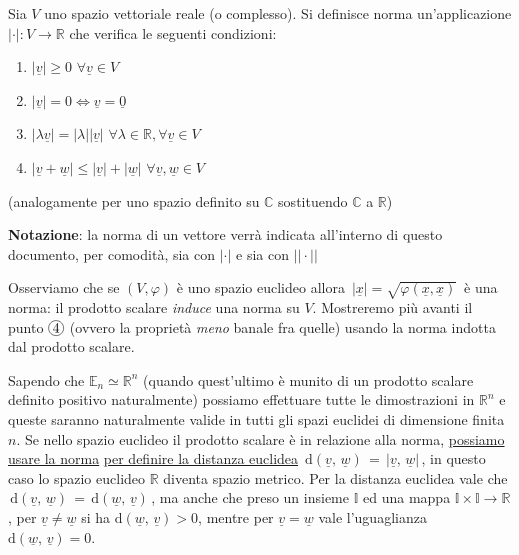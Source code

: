 \begin{definition}[\textcolor{blue}{norma}]
	Sia $V$ uno spazio vettoriale reale (o complesso). Si definisce norma un'applicazione $| \cdot |: V \to \mathbb{R}$ che verifica le seguenti condizioni:
	\begin{enumerate}[label=\protect\circled{\arabic*}]
		\item $|\underline{v}| \geq 0 \, \, \forall \underline{v} \in V$
		\item $| \underline{v} | = 0 \iff \underline{v} = \underline{0}$
		\item $| \lambda \underline{v} | = | \lambda | | \underline{v} | \, \, \forall \lambda \in \mathbb{R}, \forall \underline{v} \in V$
		\item $| \underline{v} + \underline{w} | \leq | \underline{v} | + | \underline{w} | \, \, \forall \underline{v}, \underline{w} \in V$
	\end{enumerate}
	(analogamente per uno spazio definito su $\mathbb{C}$ sostituendo $\mathbb{C}$ a $\mathbb{R}$)
\end{definition}
%
\noindent \textbf{Notazione}: la norma di un vettore verrà indicata all'interno di questo documento, per comodità, sia con $|\cdot|$ e sia con $||\cdot||$
%
\begin{remark}
	Osserviamo che se $(V, \varphi)$ è uno spazio euclideo allora $\boxed{\,| \underline x | = \sqrt{\varphi(\underline x, \underline x)}\, }$ è una norma: il prodotto scalare \emph{induce} una norma su $V$. Mostreremo più avanti il punto $\circled{4}$ (ovvero la proprietà \emph{meno} banale fra quelle) usando la norma indotta dal prodotto scalare.
\end{remark}
%
\noindent Sapendo che $\mathbb{E}_n \simeq \mathbb{R}^n$ (quando quest'ultimo è munito di un prodotto scalare definito positivo naturalmente) possiamo effettuare tutte le dimostrazioni in $\mathbb{R}^n$ e queste saranno naturalmente valide in tutti gli spazi euclidei di dimensione finita $n$. 
%
Se nello spazio euclideo il prodotto scalare è in relazione alla norma, \underline{possiamo usare la norma} \underline{per definire la distanza euclidea} $\,\text{d} (\underline v,\, \underline w)\, =\, |\underline v,\, \underline w |\,$, in questo caso lo spazio euclideo $\mathbb{R}$ diventa spazio metrico.
%
Per la distanza euclidea vale che $\,\text{d} (\underline v,\, \underline w)\, =\, \text{d} (\underline w,\, \underline v)\,$, ma anche che preso un insieme $\mathbb{I}$ ed una mappa $\mathbb{I\times I\rightarrow R}$, per $\underline v \neq \underline w$ si ha $\text{d} (\underline w,\, \underline v)>0$, mentre per $\underline v = \underline w$ vale l'uguaglianza $\text{d} (\underline w,\, \underline v)=0$.  
